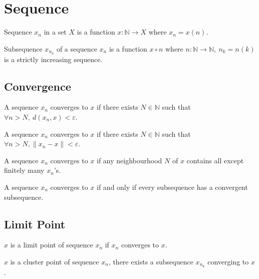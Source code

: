 \section{Sequence}
\begin{definition}
	Sequence $x_n$ in a set $X$ is a function $x : \mathbb{N} \to X$ where $x_n = x(n)$.
\end{definition}

\begin{definition}
	Subsequence $x_{n_k}$ of a sequence $x_n$ is a function $x \circ n$ where $n : \mathbb{N}\to \mathbb{N},\ n_k = n(k)$ is a strictly increasing sequence.
\end{definition}

\subsection{Convergence}
\begin{definition}[metric]
	A sequence $x_n$ converges to $x$ if there exists $N \in \mathbb{N}$ such that $\forall n > N,\ d(x_n,x) < \varepsilon$.
\end{definition}

\begin{definition}[norm]
	A sequence $x_n$ converges to $x$ if there exists $N \in \mathbb{N}$ such that $\forall n > N, \|x_n-x\| < \varepsilon$.
\end{definition}

\begin{definition}[neighbourhood]
	A sequence $x_n$ converges to $x$ if any neighbourhood $N$ of $x$ contains all except finitely many $x_n$'s.
\end{definition}

\begin{remark}[subsequence]
	A sequence $x_n$ converges to $x$ if and only if every subsequence has a convergent subsequence.
\end{remark}

\subsection{Limit Point}
\begin{definition}
	$x$ is a limit point of sequence $x_n$ if $x_n$ converges to $x$.
\end{definition}

\begin{definition}
	$x$ is a cluster point of sequence $x_n$, there exists a subsequence $x_{n_k}$ converging to $x$.
\end{definition}

